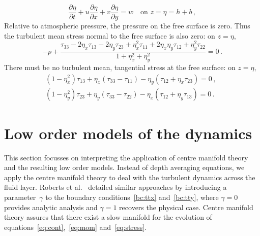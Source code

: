 \documentclass[a5paper,12pt]{article}
\begin{document}
\begin{equation}
 \frac{\partial\eta}{\partial t}+u\frac{\partial\eta}{\partial x}+v\frac{\partial\eta}{\partial y}=w \quad\text{on } z=\eta=h+b\,,
\end{equation}
Relative to atmospheric pressure, the pressure on the free surface is zero. 
Thus the turbulent mean stress normal to the free surface is also zero: on $z=\eta$,
\begin{equation}
    -p+\frac{\tau_{33} -2\eta_x\tau_{13} -2\eta_y\tau_{23}
    +\eta_x^2\tau_{11} +2\eta_x\eta_y\tau_{12}+\eta_y^2\tau_{22}}
    {1+\eta_x^2+\eta_y^2}
     =0\,.
    \label{bc:ttz}
\end{equation}
There must be no turbulent mean, tangential stress at the free surface: on $z=\eta$,
\begin{eqnarray}&&
    (1-\eta_x^2)\tau_{13}+\eta_x(\tau_{33}-\tau_{11})-\eta_y(\tau_{12}+\eta_x\tau_{23})=0\,,
   \qquad\label{bc:ttx} \\&&
    (1-\eta_y^2)\tau_{23}+\eta_y(\tau_{33}-\tau_{22})
    -\eta_x(\tau_{12}+\eta_y\tau_{13})=0\,.
   \qquad\label{bc:tty}
\end{eqnarray}




\section{Low order models of the dynamics}

This section focusses on interpreting the application of centre manifold theory and the resulting low order models.
Instead of depth averaging equations, we apply the centre manifold theory to deal with the turbulent dynamics across the fluid layer. 
Roberts et al.~\cite{Roberts2008,Georgiev2008} detailed similar approaches by introducing a parameter~$\gamma$ to the boundary conditions~\eqref{bc:ttx} and~\eqref{bc:tty}, where $\gamma=0$ provides analytic analysis and $\gamma=1$ recovers the physical case. 
Centre manifold theory assures that there exist a slow manifold for the evolution of equations~\eqref{eq:cont},~\eqref{eq:mom} and~\eqref{eq:stress}.
 
\end{document}
